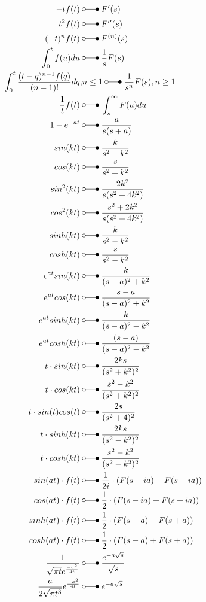 \begin{align*}
    -tf(t)                          \;&\laplace\; F^{\prime}(s)  \\
    t^{2}f(t)                       \;&\laplace\; F^{\prime\prime}(s)  \\
    (-t)^n f(t)                     \;&\laplace\; F^{(n)}(s)  \\
    \int_{0}^{t}f(u)du              \;&\laplace\; \frac{1}{s}F(s)  \\
    \int_{0}^{t}\frac{(t-q)^{n-1}f(q)}{(n-1)!}dq,&n \leq 1 \;\laplace\; \frac{1}{s^n}F(s),n \geq 1  \\
    \frac{1}{t}f(t)                 \;&\laplace\; \int_{s}^{\infty}F(u)du  \\
    1-e^{-at}                       \;&\laplace\; \frac{a}{s(s+a)}  \\
    sin(kt)                         \;&\laplace\; \frac{k}{s^2+k^2}  \\
    cos(kt)                         \;&\laplace\; \frac{s}{s^2+k^2}  \\
    sin^{2}(kt)                     \;&\laplace\; \frac{2k^2}{s(s^2+4k^2)}  \\
    cos^{2}(kt)                     \;&\laplace\; \frac{s^2+2k^2}{s(s^2+4k^2)}  \\
    sinh(kt)                        \;&\laplace\; \frac{k}{s^2-k^2} \\
    cosh(kt)                        \;&\laplace\; \frac{s}{s^2-k^2} \\
    e^{at}sin(kt)                   \;&\laplace\; \frac{k}{(s-a)^2+k^2}  \\
    e^{at}cos(kt)                   \;&\laplace\; \frac{s-a}{(s-a)^2+k^2}  \\
    e^{at}sinh(kt)                  \;&\laplace\; \frac{k}{(s-a)^2-k^2}  \\
    e^{at}cosh(kt)                  \;&\laplace\; \frac{(s-a)}{(s-a)^2-k^2}  \\
    t\cdot sin(kt)                        \;&\laplace\; \frac{2ks}{(s^2+k^2)^2}  \\
    t\cdot cos(kt)                        \;&\laplace\; \frac{s^2-k^2}{(s^2+k^2)^2}  \\
    t\cdot sin(t)cos(t)                   \;&\laplace\; \frac{2s}{(s^2+4)^2}  \\
    t\cdot sinh(kt)                       \;&\laplace\; \frac{2ks}{(s^2-k^2)^2}  \\
    t\cdot cosh(kt)                       \;&\laplace\; \frac{s^2-k^2}{(s^2-k^2)^2}  \\
    sin(at)\cdot f(t)               \;&\laplace\; \frac{1}{2i}\cdot(F(s-ia)-F(s+ia)) \\
    cos(at)\cdot f(t)               \;&\laplace\; \frac{1}{2}\cdot(F(s-ia)+F(s+ia)) \\
    sinh(at)\cdot f(t)              \;&\laplace\; \frac{1}{2}\cdot(F(s-a)-F(s+a)) \\
    cosh(at)\cdot f(t)              \;&\laplace\; \frac{1}{2}\cdot(F(s-a)+F(s+a)) \\
    \frac{1}{\sqrt{\pi t}e^{\frac{-a^2}{4t}}} \;&\laplace\; \frac{e^{-a\sqrt{s}}}{\sqrt{s}} \\
    \frac{a}{2\sqrt{\pi t^3}}e^{\frac{-a^2}{4t}} \;&\laplace\; e^{-a\sqrt{s}}
\end{align*}
